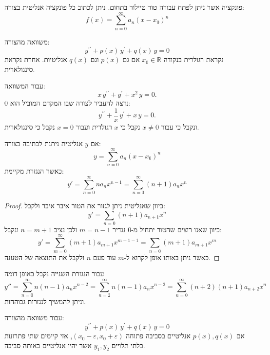 \documentclass{tstextbook}
\begin{document}
\begin{definition}
פונקציה אשר ניתן לפתח עבורה טור טיילור בתחום. ניתן לכתוב כל פונקציה אנליטית בצורה:
$$f(x)=\sum_{n=0}^{\infty} a_{n}(x-x_{0})^{n}$$

\end{definition}
\begin{definition}
משוואה מהצורה:
$$y^{\prime\prime}+p(x)\,y^{\prime}+q(x)\,y=0$$
נקראת רגולרית בנקודה \(x_{0} \in \mathbb{R}\) אם גם \(p(x)\) וגם \(q(x)\) אנליטיות. אחרת נקראת סינגולארית.

\end{definition}
\begin{example}
עבור המשוואה:
$$x\,y^{\prime\prime}+y^{\prime}+x^{2}\,y=0.$$
נרצה להעביר לצורה שבו המקדם המוביל הוא 0:
$$y^{\prime\prime}+\frac{1}{x}\,y^{\prime}+x\,y=0.$$
ונקבל כי עבור \(x\neq 0\) נקבל כי \(x\) רגולרית ועבור \(x=0\) נקבל כי סינגולארית. 

\end{example}
\begin{proposition}
אם \(y\) אנליטית ניתנת לכתיבה בצורה:
$$y=\sum_{n=0}^{\infty} a_{n}(x-x_{0})^{n}$$
כאשר הנגזרת מקיימת:
$$
y'=\sum_{n=0}^\infty na_{n}x^{n-1}=\sum_{n=0}^\infty (n+1)a_{n}x^{n}$$

\end{proposition}
\begin{proof}
כיוון שאנליטית ניתן לגזור את הטור איבר איבר ולקבל:
$$y'=\sum_{n=0} (n+1)a_{n+1}x^{n}$$
כיוון שאנו רוצים שהטור יתחיל מ-0 נגדיר \(m=n-1\) ולכן נציב \(n=m+1\) ונקבל:
$$y'=\sum_{m=0}^\infty (m+1) a_{m+1}x^{m+1-1}=\sum_{n=0} (m+1)a_{m+1}x^{m}$$
כאשר ניתן באותו אופן לקרוא ל-\(m\) עוד פעם \(n\) ולקבל את התוצאה של הטענה.

\end{proof}
\begin{corollary}
עבור הנגזרת השנייה נקבל באופן דומה
$$y''=\sum_{n=0}^\infty n(n-1)a_{n}x^{n-2}=\sum_{n=2}^{\infty}n(n-1)a_{n}x^{n-2}=\sum_{n=0}^{\infty}(n+2)(n+1)a_{n+2}x^n$$
וניתן להמשיך לנגזרות גבוההות.

\end{corollary}
\begin{proposition}
עבור משוואה מהצורה:
$$y^{\prime\prime}+p(x)\,y^{\prime}+q(x)\,y=0$$
אם \(p(x),q(x)\) אנליטיים בסביבה פתוחה \(\left( x_{0}-\varepsilon,x_{0}+\varepsilon \right)\), אזי קיימים שתי פתרונות בלתי תלויים \(y_{1},y_{2}\) אשר יהיו אנליטיים באותה סביבה.

\end{proposition}
\end{document}
